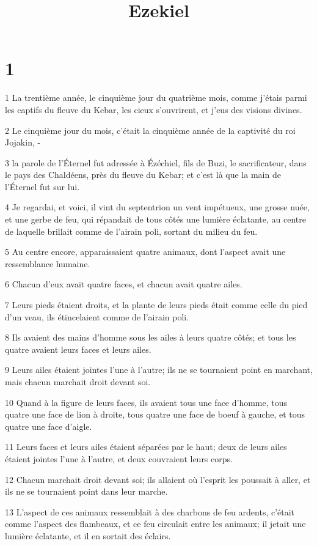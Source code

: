 

\title{Ezekiel}


\chapter{1}

\par 1 La trentième année, le cinquième jour du quatrième mois, comme j'étais parmi les captifs du fleuve du Kebar, les cieux s'ouvrirent, et j'eus des visions divines.
\par 2 Le cinquième jour du mois, c'était la cinquième année de la captivité du roi Jojakin, -
\par 3 la parole de l'Éternel fut adressée à Ézéchiel, fils de Buzi, le sacrificateur, dans le pays des Chaldéens, près du fleuve du Kebar; et c'est là que la main de l'Éternel fut sur lui.
\par 4 Je regardai, et voici, il vint du septentrion un vent impétueux, une grosse nuée, et une gerbe de feu, qui répandait de tous côtés une lumière éclatante, au centre de laquelle brillait comme de l'airain poli, sortant du milieu du feu.
\par 5 Au centre encore, apparaissaient quatre animaux, dont l'aspect avait une ressemblance humaine.
\par 6 Chacun d'eux avait quatre faces, et chacun avait quatre ailes.
\par 7 Leurs pieds étaient droits, et la plante de leurs pieds était comme celle du pied d'un veau, ils étincelaient comme de l'airain poli.
\par 8 Ils avaient des mains d'homme sous les ailes à leurs quatre côtés; et tous les quatre avaient leurs faces et leurs ailes.
\par 9 Leurs ailes étaient jointes l'une à l'autre; ils ne se tournaient point en marchant, mais chacun marchait droit devant soi.
\par 10 Quand à la figure de leurs faces, ils avaient tous une face d'homme, tous quatre une face de lion à droite, tous quatre une face de boeuf à gauche, et tous quatre une face d'aigle.
\par 11 Leurs faces et leurs ailes étaient séparées par le haut; deux de leurs ailes étaient jointes l'une à l'autre, et deux couvraient leurs corps.
\par 12 Chacun marchait droit devant soi; ils allaient où l'esprit les poussait à aller, et ils ne se tournaient point dans leur marche.
\par 13 L'aspect de ces animaux ressemblait à des charbons de feu ardents, c'était comme l'aspect des flambeaux, et ce feu circulait entre les animaux; il jetait une lumière éclatante, et il en sortait des éclairs.
